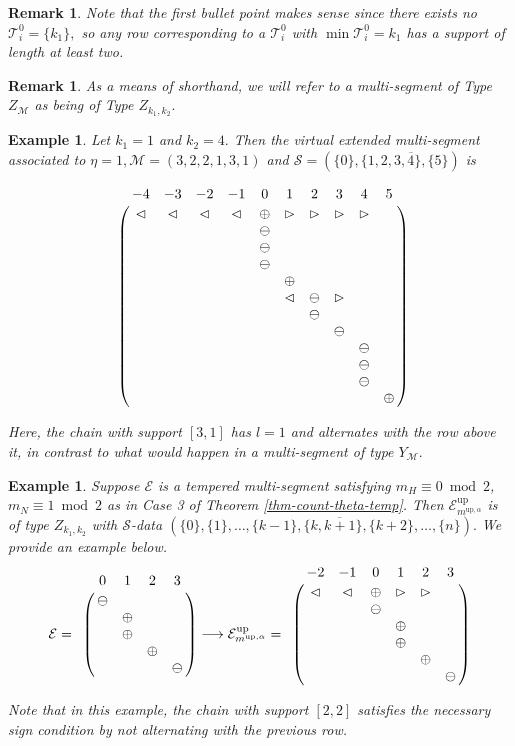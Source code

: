 \documentclass[11pt,letterpaper]{amsart}
\newcommand{\up}{{\mathrm{up}}}
\newcommand{\EE}{\mathcal{E}}
\newtheorem{rmk}[thm]{Remark}
\newtheorem{exmp}[thm]{Example}
\numberwithin{equation}{section}
\begin{document}
\begin{rmk}
    Note that the first bullet point makes sense since there exists no $\mathcal{T}_i^0 = \{k_1\},$ so any row corresponding to a $\mathcal{T}_i^0$ with $\min \mathcal{T}_i^0 = k_1$ has a support of length at least two.
\end{rmk}

\begin{rmk}
    As a means of shorthand, we will refer to a multi-segment of Type $Z_\mathcal{M}$ as being of Type $Z_{k_1, k_2}.$
\end{rmk}

\begin{exmp}
    Let $k_1 = 1$ and $k_2 = 4.$ Then the virtual extended multi-segment associated to $\eta = 1, \mathcal{M} = (3, 2, 2, 1, 3, 1)$ and $\mathcal{S} = (\{0\}, \{1, 2, 3, \overline{4}\}, \{5\})$ is

    $$\bordermatrix{& -4 & -3 & -2 & -1 & 0 & 1 & 2 & 3 & 4 & 5 \cr & \lhd & \lhd & \lhd & \lhd & \oplus & \rhd & \rhd & \rhd & \rhd \cr & & & & & \ominus \cr & & & & & \ominus \cr & & & & & \ominus \cr & & & & & & \oplus \cr & & & & & & \lhd & \ominus & \rhd \cr & & & & & & & \ominus \cr & & & & & & & & \ominus \cr & & & & & & & & &  \ominus \cr & & & & & & & & &  \ominus \cr & & & & & & & & &  \ominus \cr & & & & & & & & & & \oplus}$$

    Here, the chain with support $[3, 1]$ has $l = 1$ and alternates with the row above it, in contrast to what would happen in a multi-segment of type $Y_\mathcal{M}.$
\end{exmp}

\begin{exmp}
    Suppose $\mathcal{E}$ is a tempered multi-segment satisfying $m_H \equiv 0 \bmod{2}$, $m_N \equiv 1 \bmod{2}$ as in Case 3 of Theorem \ref{thm-count-theta-temp}. Then $\mathcal{E}_{m^{\up, \alpha}}^\up$ is of type $Z_{k_1, k_2}$ with $\mathcal{S}$-data $(\{0\}, \{1\}, \dots, \{k - 1\}, \{k, \overline{k + 1}\}, \{k + 2\}, \dots, \{n\}).$ We provide an example below.
    \[\EE = \bordermatrix{
    & 0 & 1 & 2 & 3 \cr
    & \ominus & & & \cr
    & & \oplus & & \cr
    & & \oplus & & \cr
    & & & \oplus & \cr
    & & & & \ominus \cr
    } \longrightarrow \mathcal{E}_{m^{\up, \alpha}}^\up =  \bordermatrix{
    & -2 & -1 & 0 & 1 & 2 & 3 \cr
    & \lhd & \lhd & \oplus & \rhd & \rhd & \cr
    &&& \ominus & & & \cr
    &&& & \oplus & & \cr
    &&& & \oplus & & \cr
    &&& & & \oplus & \cr
    &&& & & & \ominus \cr
    }\]

    Note that in this example, the chain with support $[2, 2]$ satisfies the necessary sign condition by not alternating with the previous row.
\end{exmp}
\end{document}
